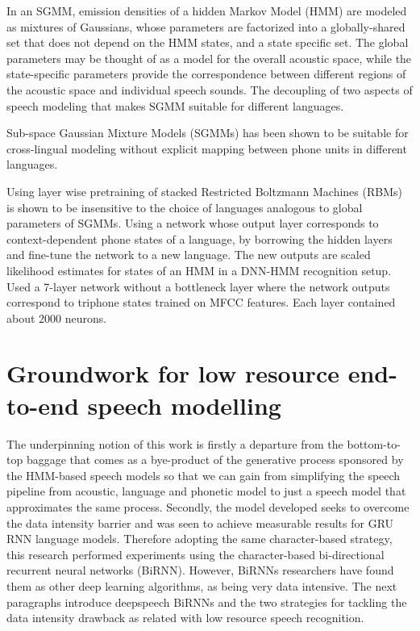 In an SGMM, emission densities of a hidden Markov Model (HMM) are modeled as mixtures of Gaussians, whose parameters are factorized into a globally-shared set that does not depend on the HMM states, and a state specific set.
The global parameters may be thought of as a model for the overall acoustic space, while the state-specific parameters provide the correspondence between different regions of the acoustic space and individual speech sounds.
The decoupling  of two aspects of speech modeling that makes SGMM suitable for different languages.

Sub-space Gaussian Mixture Models (SGMMs) has been shown to be suitable for cross-lingual modeling without explicit mapping between phone units in different languages.

Using layer wise pretraining of stacked Restricted Boltzmann Machines (RBMs) is shown to be insensitive to the choice of languages analogous to global parameters of SGMMs. Using a network whose output layer corresponds to context-dependent phone states of a language, by borrowing the hidden layers and fine-tune the network to a new language. The new outputs are scaled likelihood estimates for states of an HMM in a DNN-HMM recognition setup.
Used a 7-layer network without a bottleneck layer where the network outputs correspond to triphone states trained on MFCC features. Each layer contained about 2000 neurons.

\section{Groundwork for low resource end-to-end speech modelling}
The underpinning notion of this work is firstly a departure from the bottom-to-top baggage that comes as a bye-product of the generative process sponsored by the HMM-based speech models so that we can gain from simplifying the speech pipeline from acoustic, language and phonetic model to just a speech model that approximates the same process.  Secondly, the model developed seeks to overcome the data intensity barrier and was seen to achieve measurable results for GRU RNN language models.  Therefore adopting the same character-based strategy, this research performed experiments using the character-based bi-directional recurrent neural networks (BiRNN).  However, BiRNNs researchers have found them as other deep learning algorithms, as being very data intensive\cite{hannun2014deep}.  The next paragraphs introduce deepspeech BiRNNs and the two strategies for tackling the data intensity drawback as related with low resource speech recognition.

